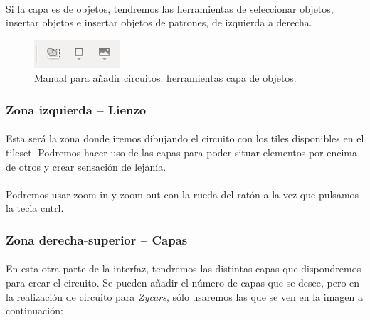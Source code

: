 \paragraph{}
Si la capa es de objetos, tendremos las herramientas de seleccionar objetos, insertar objetos e insertar objetos de patrones,
de izquierda a derecha.

\begin{figure}[H]
  \label{herramientas_objetos}
  \begin{center}
    \includegraphics[scale=1]{imagenes/manualcircuito/herramientas_objetos.png}
  \end{center}
  \caption{Manual para añadir circuitos: herramientas capa de objetos.}
\end{figure}

\subsubsection{Zona izquierda -- Lienzo}

\paragraph{}
Esta será la zona donde iremos dibujando el circuito con los tiles disponibles en el tileset. Podremos hacer uso de las capas
para poder situar elementos por encima de otros y crear sensación de lejanía.

\paragraph{}
Podremos usar zoom in y zoom out con la rueda del ratón a la vez que pulsamos la tecla cntrl.

\subsubsection{Zona derecha-superior -- Capas}

\paragraph{}
En esta otra parte de la interfaz, tendremos las distintas capas que dispondremos para crear el circuito. Se pueden añadir
el número de capas que se desee, pero en la realización de circuito para \emph{Zycars}, sólo usaremos las que se ven en la imagen 
a continuación:

